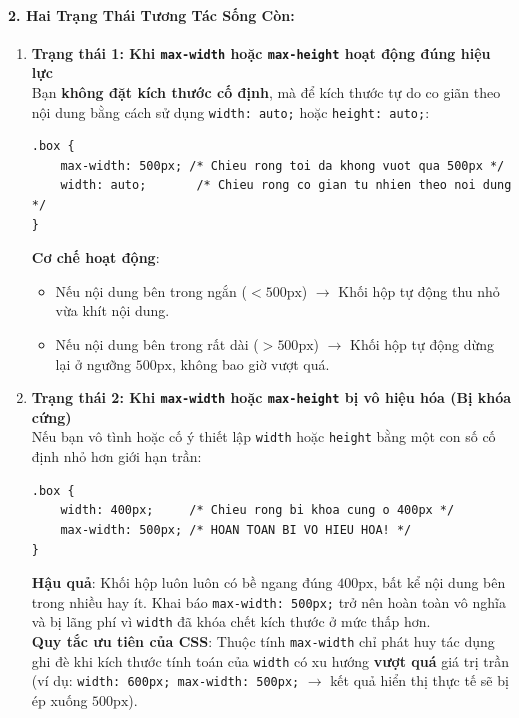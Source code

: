 \documentclass[11pt,oneside]{book}
\newcommand{\codeinline}[1]{\textcolor{accentOrange}{\texttt{#1}}}
\begin{document}
\paragraph{2. Hai Trạng Thái Tương Tác Sống Còn:}
\begin{enumerate}[leftmargin=1.5em, itemsep=4pt, parsep=0pt]
    \item \textbf{Trạng thái 1: Khi \codeinline{max-width} hoặc \codeinline{max-height} hoạt động đúng hiệu lực}\\
    Bạn \textbf{không đặt kích thước cố định}, mà để kích thước tự do co giãn theo nội dung bằng cách sử dụng \codeinline{width: auto;} hoặc \codeinline{height: auto;}:
    \begin{codeWindow}
\begin{lstlisting}[language=CSS3]
.box {
    max-width: 500px; /* Chieu rong toi da khong vuot qua 500px */
    width: auto;       /* Chieu rong co gian tu nhien theo noi dung */
}
\end{lstlisting}
    \end{codeWindow}
    \textbf{Cơ chế hoạt động}:
    \begin{itemize}[leftmargin=1.2em, itemsep=2pt, parsep=0pt]
        \item Nếu nội dung bên trong ngắn ($< 500\text{px}$) $\rightarrow$ Khối hộp tự động thu nhỏ vừa khít nội dung.
        \item Nếu nội dung bên trong rất dài ($> 500\text{px}$) $\rightarrow$ Khối hộp tự động dừng lại ở ngưỡng $500\text{px}$, không bao giờ vượt quá.
    \end{itemize}

    \item \textbf{Trạng thái 2: Khi \codeinline{max-width} hoặc \codeinline{max-height} bị vô hiệu hóa (Bị khóa cứng)}\\
    Nếu bạn vô tình hoặc cố ý thiết lập \codeinline{width} hoặc \codeinline{height} bằng một con số cố định nhỏ hơn giới hạn trần:
    \begin{codeWindow}
\begin{lstlisting}[language=CSS3]
.box {
    width: 400px;     /* Chieu rong bi khoa cung o 400px */
    max-width: 500px; /* HOAN TOAN BI VO HIEU HOA! */
}
\end{lstlisting}
    \end{codeWindow}
    \textbf{Hậu quả}: Khối hộp luôn luôn có bề ngang đúng $400\text{px}$, bất kể nội dung bên trong nhiều hay ít. Khai báo \codeinline{max-width: 500px;} trở nên hoàn toàn vô nghĩa và bị lãng phí vì \codeinline{width} đã khóa chết kích thước ở mức thấp hơn.\\
    \textbf{Quy tắc ưu tiên của CSS}: Thuộc tính \codeinline{max-width} chỉ phát huy tác dụng ghi đè khi kích thước tính toán của \codeinline{width} có xu hướng \textbf{vượt quá} giá trị trần (ví dụ: \codeinline{width: 600px; max-width: 500px;} $\rightarrow$ kết quả hiển thị thực tế sẽ bị ép xuống $500\text{px}$).
\end{enumerate}
\end{document}
